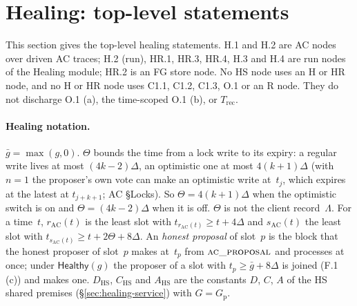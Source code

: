 \documentclass{article}
\newcommand{\fname}[1]{\text{\textsc{#1}}}
\begin{document}
\section{Healing: top-level statements}\label{sec:healing-top}

This section gives the top-level healing statements.  H.1 and H.2 are AC nodes over
driven AC traces; H.2 (run), HR.1, HR.3, HR.4, H.3 and H.4 are run nodes of
the Healing module; HR.2 is an FG store node.  No HS node uses an H or HR
node, and no H or HR node uses C1.1, C1.2, C1.3, O.1 or an R node.  They do
not discharge O.1 (a), the time-scoped O.1 (b), or $T_{\mathrm{rec}}$.

\paragraph{Healing notation.}  $\bar g=\max(g,0)$.  $\Theta$ bounds the
time from a lock write to its expiry: a regular write lives at most
$(4k-2)\Delta$, an optimistic one at most $4(k+1)\Delta$ (with $n=1$ the
proposer's own vote can make an optimistic write at~$t_j$, which expires at
the latest at $t_{j+k+1}$; AC \S Locks).  So $\Theta=4(k+1)\Delta$ when the
optimistic switch is on and $\Theta=(4k-2)\Delta$ when it is off.
$\Theta$ is not the client record~$\Lambda$.  For a time~$t$,
$r_{\mathrm{AC}}(t)$ is the least slot with $t_{r_{\mathrm{AC}}(t)}\geq
t+4\Delta$ and $s_{\mathrm{AC}}(t)$ the least slot with
$t_{s_{\mathrm{AC}}(t)}\geq t+2\Theta+8\Delta$.  An \emph{honest proposal} of
slot~$p$ is the block that the honest proposer of slot~$p$ makes at~$t_p$
from $\fname{ac\_proposal}$ and processes at once; under
$\mathsf{Healthy}(g)$ the proposer of a slot with $t_p\geq\bar g+8\Delta$ is
joined (F.1 (c)) and makes one.  $D_{\mathrm{HS}}$, $C_{\mathrm{HS}}$ and
$A_{\mathrm{HS}}$ are the constants $D$, $C$, $A$ of the HS shared premises
(\S\ref{sec:healing-service}) with $G=G_{\mathrm p}$.
\end{document}

